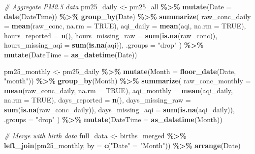 \documentclass[
]{article}
\newenvironment{Shaded}{\begin{snugshade}}{\end{snugshade}}
\newcommand{\AttributeTok}[1]{\textcolor[rgb]{0.13,0.29,0.53}{#1}}
\newcommand{\CommentTok}[1]{\textcolor[rgb]{0.56,0.35,0.01}{\textit{#1}}}
\newcommand{\ConstantTok}[1]{\textcolor[rgb]{0.56,0.35,0.01}{#1}}
\newcommand{\FunctionTok}[1]{\textcolor[rgb]{0.13,0.29,0.53}{\textbf{#1}}}
\newcommand{\NormalTok}[1]{#1}
\newcommand{\OtherTok}[1]{\textcolor[rgb]{0.56,0.35,0.01}{#1}}
\newcommand{\SpecialCharTok}[1]{\textcolor[rgb]{0.81,0.36,0.00}{\textbf{#1}}}
\newcommand{\StringTok}[1]{\textcolor[rgb]{0.31,0.60,0.02}{#1}}
\begin{document}
\begin{Shaded}
\begin{Highlighting}[]
\CommentTok{\# Aggregate PM2.5 data}
\NormalTok{pm25\_daily }\OtherTok{\textless{}{-}}\NormalTok{ pm25\_all }\SpecialCharTok{\%\textgreater{}\%}
  \FunctionTok{mutate}\NormalTok{(}\AttributeTok{Date =} \FunctionTok{date}\NormalTok{(DateTime)) }\SpecialCharTok{\%\textgreater{}\%}
  \FunctionTok{group\_by}\NormalTok{(Date) }\SpecialCharTok{\%\textgreater{}\%}
  \FunctionTok{summarize}\NormalTok{(}
    \AttributeTok{raw\_conc\_daily =} \FunctionTok{mean}\NormalTok{(raw\_conc, }\AttributeTok{na.rm =} \ConstantTok{TRUE}\NormalTok{),}
    \AttributeTok{aqi\_daily =} \FunctionTok{mean}\NormalTok{(aqi, }\AttributeTok{na.rm =} \ConstantTok{TRUE}\NormalTok{),}
    \AttributeTok{hours\_reported =} \FunctionTok{n}\NormalTok{(),}
    \AttributeTok{hours\_missing\_raw =} \FunctionTok{sum}\NormalTok{(}\FunctionTok{is.na}\NormalTok{(raw\_conc)),}
    \AttributeTok{hours\_missing\_aqi =} \FunctionTok{sum}\NormalTok{(}\FunctionTok{is.na}\NormalTok{(aqi)),}
    \AttributeTok{.groups =} \StringTok{"drop"}
\NormalTok{  ) }\SpecialCharTok{\%\textgreater{}\%}
  \FunctionTok{mutate}\NormalTok{(}\AttributeTok{DateTime =} \FunctionTok{as\_datetime}\NormalTok{(Date))}

\NormalTok{pm25\_monthly }\OtherTok{\textless{}{-}}\NormalTok{ pm25\_daily }\SpecialCharTok{\%\textgreater{}\%}
  \FunctionTok{mutate}\NormalTok{(}\AttributeTok{Month =} \FunctionTok{floor\_date}\NormalTok{(Date, }\StringTok{"month"}\NormalTok{)) }\SpecialCharTok{\%\textgreater{}\%}
  \FunctionTok{group\_by}\NormalTok{(Month) }\SpecialCharTok{\%\textgreater{}\%}
  \FunctionTok{summarize}\NormalTok{(}
    \AttributeTok{raw\_conc\_monthly =} \FunctionTok{mean}\NormalTok{(raw\_conc\_daily, }\AttributeTok{na.rm =} \ConstantTok{TRUE}\NormalTok{),}
    \AttributeTok{aqi\_monthly =} \FunctionTok{mean}\NormalTok{(aqi\_daily, }\AttributeTok{na.rm =} \ConstantTok{TRUE}\NormalTok{),}
    \AttributeTok{days\_reported =} \FunctionTok{n}\NormalTok{(),}
    \AttributeTok{days\_missing\_raw =} \FunctionTok{sum}\NormalTok{(}\FunctionTok{is.na}\NormalTok{(raw\_conc\_daily)),}
    \AttributeTok{days\_missing\_aqi =} \FunctionTok{sum}\NormalTok{(}\FunctionTok{is.na}\NormalTok{(aqi\_daily)),}
    \AttributeTok{.groups =} \StringTok{"drop"}
\NormalTok{  ) }\SpecialCharTok{\%\textgreater{}\%}
  \FunctionTok{mutate}\NormalTok{(}\AttributeTok{DateTime =} \FunctionTok{as\_datetime}\NormalTok{(Month))}

\CommentTok{\# Merge with birth data}
\NormalTok{full\_data }\OtherTok{\textless{}{-}}\NormalTok{ births\_merged }\SpecialCharTok{\%\textgreater{}\%}
  \FunctionTok{left\_join}\NormalTok{(pm25\_monthly, }\AttributeTok{by =} \FunctionTok{c}\NormalTok{(}\StringTok{"Date"} \OtherTok{=} \StringTok{"Month"}\NormalTok{)) }\SpecialCharTok{\%\textgreater{}\%}
  \FunctionTok{arrange}\NormalTok{(Date)}
\end{Highlighting}
\end{Shaded}
\end{document}
